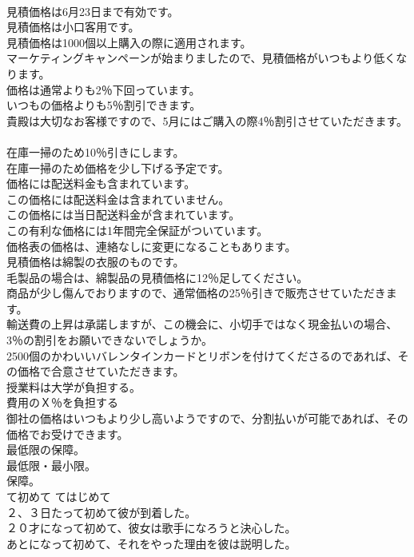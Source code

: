 \documentclass[8pt]{extreport}
\begin{document}
\begin{CJK}{UTF8}{min}
\\	見積価格は6月23日まで有効です。  
\\	見積価格は小口客用です。   
\\	見積価格は1000個以上購入の際に適用されます。   
\\	マーケティングキャンペーンが始まりましたので、見積価格がいつもより低くなります。   
\\	価格は通常よりも2％下回っています。   
\\	いつもの価格よりも5％割引できます。   
\\	貴殿は大切なお客様ですので、5月にはご購入の際4％割引させていただきます。   
\\	在庫一掃のため10％引きにします。   
\\	在庫一掃のため価格を少し下げる予定です。   
\\	価格には配送料金も含まれています。   
\\	この価格には配送料金は含まれていません。   
\\	この価格には当日配送料金が含まれています。   
\\	この有利な価格には1年間完全保証がついています。   
\\	価格表の価格は、連絡なしに変更になることもあります。   
\\	見積価格は綿製の衣服のものです。   
\\	毛製品の場合は、綿製品の見積価格に12％足してください。   
\\	商品が少し傷んでおりますので、通常価格の25％引きで販売させていただきます。   
\\	輸送費の上昇は承諾しますが、この機会に、小切手ではなく現金払いの場合、3％の割引をお願いできないでしょうか。  
\\	2500個のかわいいバレンタインカードとリボンを付けてくださるのであれば、その価格で合意させていただきます。  
\\	授業料は大学が負担する。  
\\	費用のＸ％を負担する 
\\	御社の価格はいつもより少し高いようですので、分割払いが可能であれば、その価格でお受けできます。  
\\	最低限の保障。   
\\	最低限・最小限。   
\\	保障。   
\\	て初めて	てはじめて	
\\	２、３日たって初めて彼が到着した。   
\\	２０才になって初めて、彼女は歌手になろうと決心した。   
\\	あとになって初めて、それをやった理由を彼は説明した。   

\end{CJK}
\end{document}
